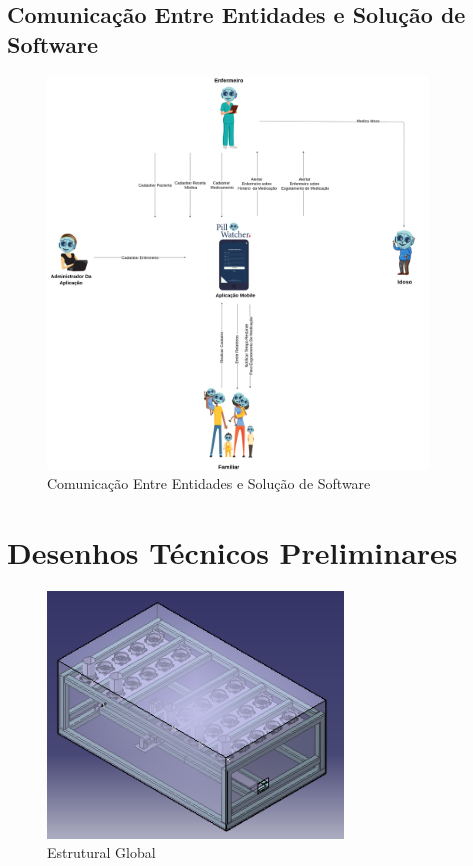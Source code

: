 \begin{apendicesenv}
\section{Comunicação Entre Entidades e Solução de Software}
\begin{figure}[H]
    \centering
    \includegraphics[width=0.9\textwidth]{figuras/Comunicação Entre Entidades e Solução De Software.png}
    \caption{Comunicação Entre Entidades e Solução de Software}
    \label{fig:Communication_between_entities}
\end{figure}

\chapter{Desenhos Técnicos Preliminares}\label{cad_preliminar}


\begin{figure}[H]
    \centering
    \includegraphics[width=0.7\textwidth]{figuras/estrutura/Global.png}
    \caption{Estrutural Global}
    \label{fig:global}
\end{figure}


\end{apendicesenv}
